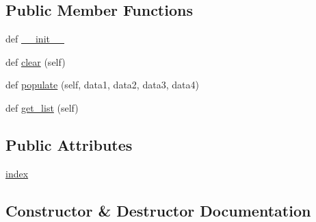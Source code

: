 \subsection*{Public Member Functions}
\begin{DoxyCompactItemize}
\item 
def \hyperlink{class_uni_dec_1_1unidec__modules_1_1masstools_1_1_match_list_crtl_af39a0dc057cf965cd6d690ce4fc13315}{\+\_\+\+\_\+init\+\_\+\+\_\+}
\item 
def \hyperlink{class_uni_dec_1_1unidec__modules_1_1masstools_1_1_match_list_crtl_a480d0647c081afb946d0389e8cf52c97}{clear} (self)
\item 
def \hyperlink{class_uni_dec_1_1unidec__modules_1_1masstools_1_1_match_list_crtl_abe1bd725bd42bdb178b73ec9707970ef}{populate} (self, data1, data2, data3, data4)
\item 
def \hyperlink{class_uni_dec_1_1unidec__modules_1_1masstools_1_1_match_list_crtl_a80d9f70636cb9ef012d8b662d49e1759}{get\+\_\+list} (self)
\end{DoxyCompactItemize}
\subsection*{Public Attributes}
\begin{DoxyCompactItemize}
\item 
\hyperlink{class_uni_dec_1_1unidec__modules_1_1masstools_1_1_match_list_crtl_adda02edb70b3da0293b15cb196b5fd8e}{index}
\end{DoxyCompactItemize}


\subsection{Constructor \& Destructor Documentation}
\hypertarget{class_uni_dec_1_1unidec__modules_1_1masstools_1_1_match_list_crtl_af39a0dc057cf965cd6d690ce4fc13315}{}
